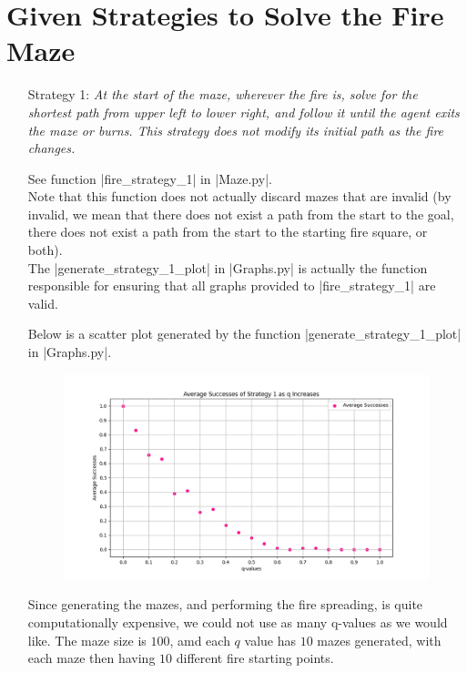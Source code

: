 \documentclass[12pt, twoside]{article}
\begin{document}
\section{Given Strategies to Solve the Fire Maze}
\begin{itemize}
    \item[Strategy 1:] 
        \textit{At the start of the maze, wherever the fire is, solve for the shortest path from upper left to lower right, and follow  it  until  the  agent  exits  the  maze  or  burns.   This  strategy  does  not  modify  its  initial  path  as  the  fire changes.}
    
        \vspace{4mm}
        See function \cverb|fire_strategy_1| in \cverb|Maze.py|. \\
        Note that this function does not actually discard mazes that are invalid (by invalid, we mean that there does not exist a path from the start to the goal, there does not exist a path from the start to the starting fire square, or both). \\
        The \cverb|generate_strategy_1_plot| in \cverb|Graphs.py| is actually the function responsible for ensuring that all graphs provided to \cverb|fire_strategy_1| are valid.

        \vspace{4mm}
        Below is a scatter plot generated by the function \cverb|generate_strategy_1_plot| in \cverb|Graphs.py|.

        \begin{figure}[h]
            \centering
            \includegraphics[scale = 0.6]{strategy_1_scatter.png}
        \end{figure}

        Since generating the mazes, and performing the fire spreading, is quite computationally expensive, we could not use as many q-values as we would like. The maze size is $100$, amd each $q$ value has $10$ mazes generated, with each maze then having $10$ different fire starting points.


\end{itemize}
\end{document}
